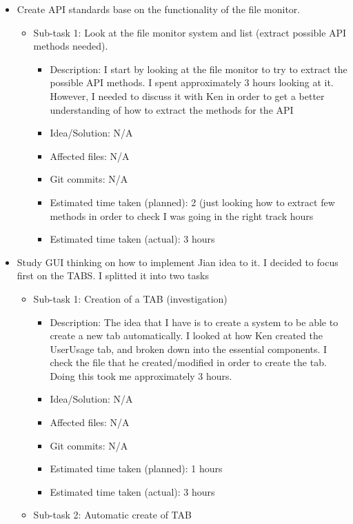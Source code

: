 \begin{itemize}
	\item Create API standards base on the functionality of the file monitor.
	     \begin{itemize}
	        \item Sub-task 1: Look at the file monitor system and list (extract possible API methods needed).
	           \begin{itemize}
		   	\item Description: I start by looking at the file monitor to try to extract the possible API methods.  I spent approximately 3 hours looking at it.  However, I needed to discuss it with Ken in order to get a better understanding of how to extract the methods for the API
			\item Idea/Solution: N/A
			\item Affected files: N/A
			\item Git commits: N/A
			\item Estimated time taken (planned): 2 (just looking how to extract few methods in order to check I was going in the right track hours
			\item Estimated time taken (actual): 3 hours
		\end{itemize}
	     \end{itemize}
	\item Study GUI thinking on how to implement Jian idea to it.  I decided to focus first on the TABS.  I splitted it into two tasks
	     \begin{itemize}
	         \item Sub-task 1: Creation of a TAB (investigation)
	            \begin{itemize}
	         	\item Description: The idea that I have is to create a system to be able to create a new tab automatically.  I looked at how Ken created the UserUsage tab, and broken down into the essential components.  I check the file that he created/modified in order to create the tab.  Doing this took me approximately 3 hours.
			\item Idea/Solution: N/A
			\item Affected files: N/A
			\item Git commits: N/A
			\item Estimated time taken (planned): 1 hours
			\item Estimated time taken (actual): 3 hours
		  \end{itemize}
	         \item Sub-task 2: Automatic create of TAB

\end{itemize}
\end{itemize}

